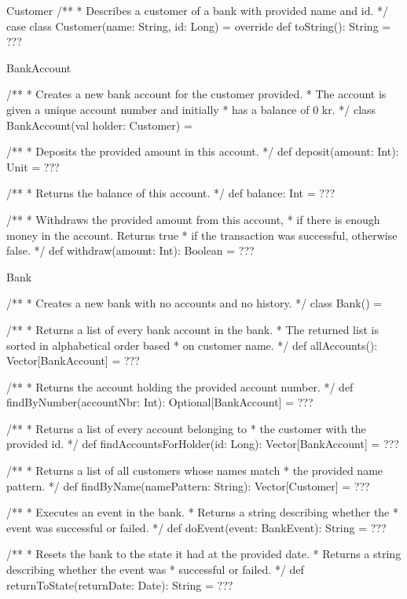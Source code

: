 \begin{ScalaSpec}{Customer}
/**
 * Describes a customer of a bank with provided name and id.
 */
case class Customer(name: String, id: Long) = {
	override def toString(): String = ???
}

\end{ScalaSpec}


\begin{ScalaSpec}{BankAccount}

/**
 * Creates a new bank account for the customer provided.
 * The account is given a unique account number and initially
 * has a balance of 0 kr.
 */
class BankAccount(val holder: Customer) = {

  /**
   * Deposits the provided amount in this account.
   */
  def deposit(amount: Int): Unit = ???

  /**
   * Returns the balance of this account.
   */
  def balance: Int = ???

  /**
   * Withdraws the provided amount from this account,
   * if there is enough money in the account. Returns true
   * if the transaction was successful, otherwise false.
   */
  def withdraw(amount: Int): Boolean = ???

}
\end{ScalaSpec}


\begin{ScalaSpec}{Bank}

/**
 * Creates a new bank with no accounts and no history.
 */
class Bank() = {

 /**
   * Returns a list of every bank account in the bank.
   * The returned list is sorted in alphabetical order based
   * on customer name.
   */
  def allAccounts(): Vector[BankAccount] = ???

  /**
   * Returns the account holding the provided account number.
   */
  def findByNumber(accountNbr: Int): Optional[BankAccount] = ???

  /**
   * Returns a list of every account belonging to
   * the customer with the provided id.
   */
  def findAccountsForHolder(id: Long): Vector[BankAccount] = ???

  /**
   * Returns a list of all customers whose names match
   * the provided name pattern.
   */
  def findByName(namePattern: String): Vector[Customer] = ???

 /**
   * Executes an event in the bank.
   * Returns a string describing whether the
   * event was successful or failed.
   */
  def doEvent(event: BankEvent): String = ???

  /**
   * Resets the bank to the state it had at the provided date.
   * Returns a string describing whether the event was
   * successful or failed.
   */
  def returnToState(returnDate: Date): String = ???

}
\end{ScalaSpec}


